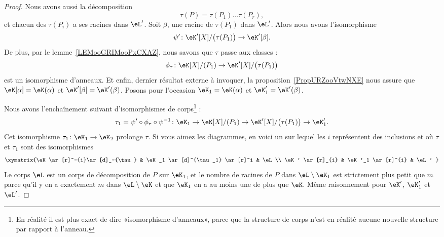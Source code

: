 \begin{proof}
    Nous avons aussi la décomposition
    \begin{equation}
        \tau(P)=\tau(P_1)\ldots \tau(P_r),
    \end{equation}
    et chacun des \( \tau(P_i)\) a ses racines dans \( \eL'\). Soit \( \beta\), une racine de \( \tau(P_1)\) dans \( \eL'\). Alors nous avons l'isomorphisme
    \begin{equation}
        \psi'\colon \eK'[X]/\big( \tau(P_1) \big)\to \eK'[\beta].
    \end{equation}
    De plus, par le lemme~\ref{LEMooGRIMooPxCXAZ}, nous savons que \( \tau\) passe aux classes :
    \begin{equation}
        \phi_{\tau}\colon \eK[X]/(P_1)\to \eK'[X]/\big( \tau(P_1) \big)
    \end{equation}
    est un isomorphisme d'anneaux. Et enfin, dernier résultat externe à invoquer, la proposition~\ref{PropURZooVtwNXE} nous assure que \( \eK[\alpha]=\eK(\alpha)\) et \( \eK'[\beta]=\eK'(\beta)\). Posons pour l'occasion \( \eK_1=\eK(\alpha)\) et \( \eK'_1=\eK'(\beta)\).

    Nous avons l'enchaînement suivant d'isomorphismes de corps\footnote{En réalité il est plus exact de dire «isomorphisme d'anneaux», parce que la structure de corps n'est en réalité aucune nouvelle structure par rapport à l'anneau.} :
    \begin{equation}
        \tau_1=\psi'\circ\phi_{\tau}\circ\psi^{-1} \colon \eK_1\to \eK[X]/(P_1)\to\eK'[X]/\big( \tau(P_1) \big)\to \eK'_1.
    \end{equation}
    Cet isomorphisme \( \tau_1\colon \eK_1\to \eK_2\) prolonge \( \tau\). Si vous aimez les diagrammes, en voici un sur lequel les \( i\) représentent des inclusions et où \( \tau\) et \( \tau_1\) sont des isomorphismes
    \begin{equation}
        \xymatrix{%
            \eK \ar[r]^-{i}\ar[d]_-{\tau}       &   \eK_1   \ar[d]^{\tau_1} \ar[r]^i    &   \eL\\
            \eK' \ar[r]_{i}                     &   \eK'_1  \ar[r]^{i}                  &   \eL'
        }
    \end{equation}
    Le corps \( \eL\) est un corps de décomposition de \( P\) sur \( \eK_1\), et le nombre de racines de \( P\) dans \( \eL\setminus\eK_1\) est strictement plus petit que \( m\) parce qu'il y en a exactement \( m\) dans \( \eL\setminus \eK\) et que \( \eK_1\) en a au moins une de plus que \( \eK\). Même raisonnement pour \( \eK'\), \( \eK'_1\) et \( \eL'\).


\end{proof}
